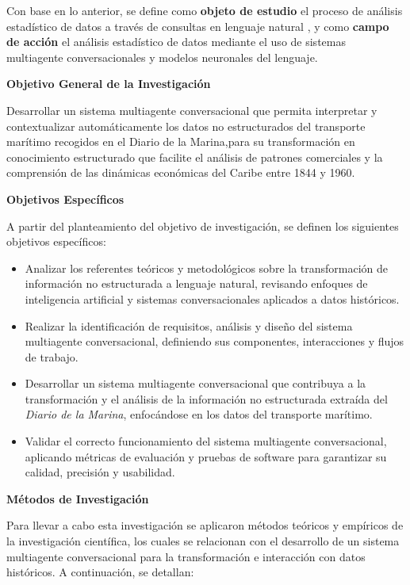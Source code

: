 Con base en lo anterior, se define como \textbf{objeto de estudio} el proceso de análisis estadístico de datos a través de consultas en lenguaje natural , y como \textbf{campo de acción} el análisis estadístico de datos mediante el uso de sistemas multiagente conversacionales y modelos neuronales del lenguaje.

\textbf{Objetivo General de la Investigación}

Desarrollar un sistema multiagente conversacional que permita interpretar y contextualizar automáticamente los datos no estructurados del transporte marítimo recogidos en el Diario de la Marina,para su transformación en conocimiento estructurado que facilite el análisis de patrones comerciales y la comprensión de las dinámicas económicas del Caribe entre 1844 y 1960.

\textbf{Objetivos Específicos}

A partir del planteamiento del objetivo de investigación, se definen los siguientes objetivos específicos:

\begin{itemize}
	\item Analizar los referentes teóricos y metodológicos sobre la transformación de información no estructurada a lenguaje natural, revisando enfoques de inteligencia artificial y sistemas conversacionales aplicados a datos históricos.
	\item Realizar la identificación de requisitos, análisis y diseño del sistema multiagente conversacional, definiendo sus componentes, interacciones y flujos de trabajo.
	\item Desarrollar un sistema multiagente conversacional que contribuya a la transformación y el análisis de la información no estructurada extraída del \textit{Diario de la Marina}, enfocándose en los datos del transporte marítimo.
	\item Validar el correcto funcionamiento del sistema multiagente conversacional, aplicando métricas de evaluación y pruebas de software para garantizar su calidad, precisión y usabilidad.
\end{itemize}

\textbf{Métodos de Investigación}

Para llevar a cabo esta investigación se aplicaron métodos teóricos y empíricos de la investigación científica, los cuales se relacionan con el desarrollo de un sistema multiagente conversacional para la transformación e interacción con datos históricos. A continuación, se detallan:

